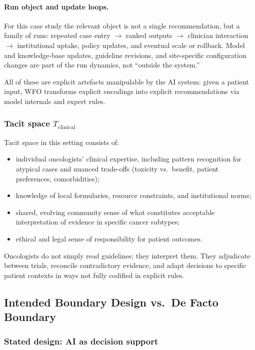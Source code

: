 \paragraph{Run object and update loops.}
For this case study the relevant object is not a single recommendation, but a family of runs:
repeated case entry \(\to\) ranked outputs \(\to\) clinician interaction \(\to\) institutional uptake, policy
updates, and eventual scale or rollback. Model and knowledge-base updates, guideline revisions, and
site-specific configuration changes are part of the run dynamics, not “outside the system.”

All of these are explicit artefacts manipulable by the AI system:
given a patient input, WFO transforms explicit encodings into explicit
recommendations via model internals and expert rules.

\subsubsection*{Tacit space \(T_{\mathrm{clinical}}\)}

Tacit space in this setting consists of:

\begin{itemize}
  \item individual oncologists' clinical expertise, including pattern
        recognition for atypical cases and nuanced trade-offs
        (toxicity vs.\ benefit, patient preferences, comorbidities);
  \item knowledge of local formularies, resource constraints, and institutional
        norms;
  \item shared, evolving community sense of what constitutes acceptable
        interpretation of evidence in specific cancer subtypes;
  \item ethical and legal sense of responsibility for patient outcomes.
\end{itemize}

Oncologists do not simply read guidelines; they interpret them.
They adjudicate between trials, reconcile contradictory evidence, and adapt
decisions to specific patient contexts in ways not fully codified in
explicit rules.

\subsection{Intended Boundary Design vs.\ De Facto Boundary}

\subsubsection*{Stated design: AI as decision support}

